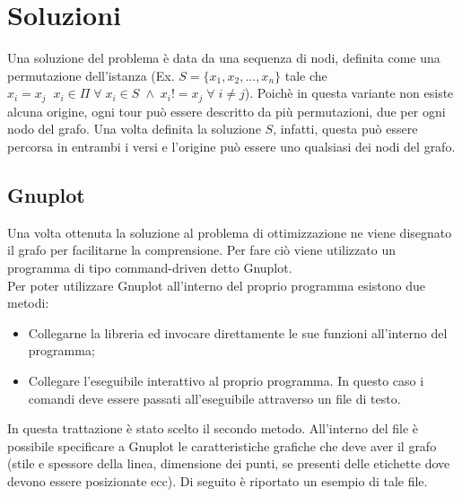 \section{Soluzioni}
Una soluzione del problema è data da una sequenza di nodi, definita come una permutazione dell'istanza (Ex. $S = \{x_1,x_2,...,x_n\}$ tale che $x_i=x_j\;\;x_i \in \Pi\;\forall\;x_i\in S\;\wedge\; x_i!=x_j\;\forall\;i\neq j$). Poichè in questa variante non esiste alcuna origine, ogni tour può essere descritto da più permutazioni, due per ogni nodo del grafo. Una volta definita la soluzione $S$, infatti, questa può essere percorsa in entrambi i versi e l'origine può essere uno qualsiasi dei nodi del grafo.\\
\subsection{Gnuplot}
Una volta ottenuta la soluzione al problema di ottimizzazione ne viene disegnato il grafo per facilitarne la comprensione. Per fare ciò viene utilizzato un programma di tipo command-driven detto Gnuplot.\\
Per poter utilizzare Gnuplot all'interno del proprio programma esistono due metodi:\\
\begin{itemize}
\item{Collegarne la libreria ed invocare direttamente le sue funzioni all'interno del programma;}
\item{Collegare l'eseguibile interattivo al proprio programma. In questo caso i comandi deve essere passati all'eseguibile attraverso un file di testo.}
\end{itemize}
In questa trattazione è stato scelto il secondo metodo. All'interno del file è possibile specificare a Gnuplot le caratteristiche grafiche che deve aver il grafo (stile e spessore della linea, dimensione dei punti, se presenti delle etichette dove devono essere posizionate ecc). Di seguito è riportato un esempio di tale file.\\



